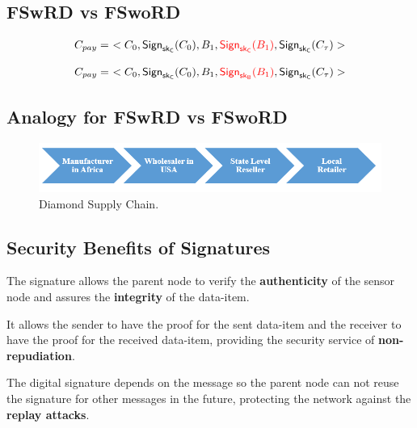 \documentclass[%
  slidesonly,%
  semlayer%
  ]{seminar}                                  %
\newcommand{\sk}{\sf{sk}}
\begin{document}
\begin{slide}
    \subsection*{FSwRD vs FSwoRD}
      \begin{equation*}  
        \begin{array}{l}
          C_{pay} =\ <C_{0},\textsf{Sign}_{\sk_{C}}(C_{0}),B_{1},\textcolor{red}{\textsf{Sign}_{\sk_{C}}(B_{1})}, \textsf{Sign}_{\sk_{C}}(C_{\tau})>
        \end{array}
      \end{equation*}

      \begin{equation*}
          C_{pay} =\ <C_{0}, \textsf{Sign}_{\sk_{C}}(C_{0}), B_{1}, \textcolor{red}{\textsf{Sign}_{\sk_{B}}(B_{1})}, \textsf{Sign}_{\sk_{C}}(C_{\tau}) >
      \end{equation*}
      
      \clearpage

    \subsection*{Analogy for FSwRD vs FSwoRD}
      \begin{figure}[h!]
        \centering
        \includegraphics[scale=0.5]{images/diamond-supply-chain.png}
        \caption{Diamond Supply Chain.}
        \label{fig:diamond-supply-chain}
      \end{figure}
      \clearpage

    \subsection*{Security Benefits of Signatures}
      The signature allows the parent node to verify the \textbf{authenticity} of the sensor node and assures the \textbf{integrity} of the data-item.

      It allows the sender to have the proof for the sent data-item and the receiver to have the proof for the received data-item, providing the security service of \textbf{non-repudiation}.

      The digital signature depends on the message so the parent node can not reuse the signature for other messages in the future, protecting the network against the \textbf{replay attacks}.


\end{slide}
\end{document}
